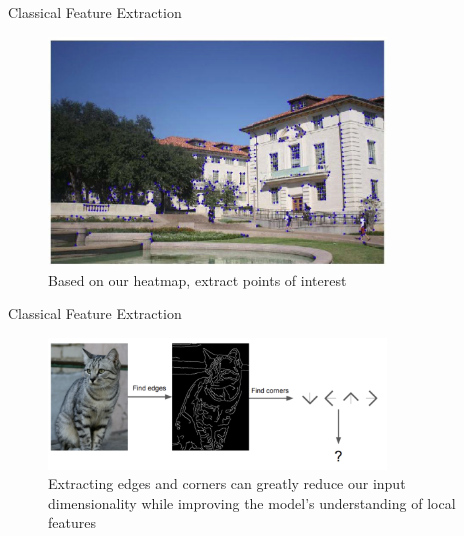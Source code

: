 \begin{frame}{Classical Feature Extraction}
    \begin{figure}
    \centering
    \includegraphics[width=0.8\textwidth]{img/houseinteresting.png}
    \caption{Based on our heatmap, extract points of interest}
    \end{figure}
\end{frame}

\begin{frame}{Classical Feature Extraction}
    \begin{figure}
    \centering
    \includegraphics[width=0.8\textwidth]{img/edgecat.png}
    \caption{Extracting edges and corners can greatly reduce our input dimensionality while improving the model's understanding of local features}
    \end{figure}
\end{frame}